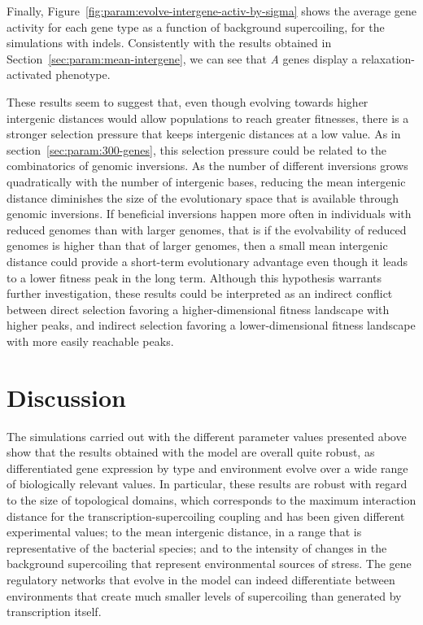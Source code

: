 Finally, Figure~\ref{fig:param:evolve-intergene-activ-by-sigma} shows the average gene activity for each gene type as a function of background supercoiling, for the simulations with indels.
Consistently with the results obtained in Section~\ref{sec:param:mean-intergene}, we can see that \emph{A} genes display a relaxation-activated phenotype.

These results seem to suggest that, even though evolving towards higher intergenic distances would allow populations to reach greater fitnesses, there is a stronger selection pressure that keeps intergenic distances at a low value.
As in section~\ref{sec:param:300-genes}, this selection pressure could be related to the combinatorics of genomic inversions.
As the number of different inversions grows quadratically with the number of intergenic bases, reducing the mean intergenic distance diminishes the size of the evolutionary space that is available through genomic inversions.
If beneficial inversions happen more often in individuals with reduced genomes than with larger genomes, that is if the evolvability of reduced genomes is higher than that of larger genomes, then a small mean intergenic distance could provide a short-term evolutionary advantage even though it leads to a lower fitness peak in the long term.
Although this hypothesis warrants further investigation, these results could be interpreted as an indirect conflict between direct selection favoring a higher-dimensional fitness landscape with higher peaks, and indirect selection favoring a lower-dimensional fitness landscape with more easily reachable peaks.


\section{Discussion}

The simulations carried out with the different parameter values presented above show that the results obtained with the model are overall quite robust, as differentiated gene expression by type and environment evolve over a wide range of biologically relevant values.
In particular, these results are robust with regard to the size of topological domains, which corresponds to the maximum interaction distance for the transcription-supercoiling coupling and has been given different experimental values; to the mean intergenic distance, in a range that is representative of the bacterial species; and to the intensity of changes in the background supercoiling that represent environmental sources of stress.
The gene regulatory networks that evolve in the model can indeed differentiate between environments that create much smaller levels of supercoiling than generated by transcription itself.


